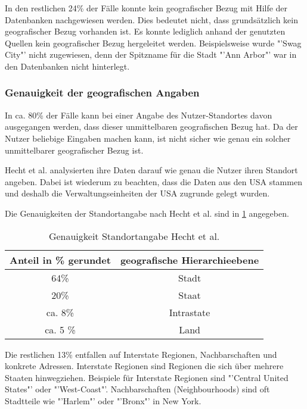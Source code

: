 				In den restlichen 24\% der Fälle konnte kein geografischer Bezug mit Hilfe der Datenbanken nachgewiesen werden. 
				Dies bedeutet nicht, dass grundsätzlich kein geografischer Bezug vorhanden ist. 
				Es konnte lediglich anhand der genutzten Quellen kein geografischer Bezug hergeleitet werden.
				Beispielsweise wurde "'Swag City"' nicht zugewiesen, denn der Spitzname für die Stadt "'Ann Arbor"' war in den Datenbanken nicht hinterlegt. 

				
			\subsubsection{Genauigkeit der geografischen Angaben}

				In ca. 80\% der Fälle kann bei einer Angabe des Nutzer-Standortes davon ausgegangen werden, dass dieser unmittelbaren geografischen Bezug hat.
				Da der Nutzer beliebige Eingaben machen kann, ist nicht sicher wie genau ein solcher unmittelbarer geografischer Bezug ist. 
				
				Hecht et al. analysierten ihre Daten darauf wie genau die Nutzer ihren Standort angeben.
				Dabei ist wiederum zu beachten, dass die Daten aus den USA stammen und deshalb die Verwaltungseinheiten der USA zugrunde gelegt wurden.
				
				Die Genauigkeiten der Standortangabe nach Hecht et al. sind in \ref{tab:genauigkeitenHecht} angegeben. 

				\begin{table}[htpb]
				\caption{Genauigkeit Standortangabe Hecht et al.} 
				\centering
				\begin{tabular}{|c||c|}
					\hline
					Anteil in \% gerundet & geografische Hierarchieebene \\
					\hline\hline
					64\% & Stadt \\
					\hline
					20\% & Staat \\
					\hline
					ca. 8\% & Intrastate \\
					\hline
					ca. 5 \% & Land \\
					\hline
				\end{tabular}
				\label{tab:genauigkeitenHecht} 
				\end{table} 

				Die restlichen 13\% entfallen auf Interstate Regionen, Nachbarschaften und konkrete Adressen. 
				Interstate Regionen sind Regionen die sich über mehrere Staaten hinwegziehen. 
				Beispiele für Interstate Regionen sind "'Central United States"' oder "'West-Coast"'.
				Nachbarschaften (Neighbourhoods) sind oft Stadtteile wie "'Harlem"' oder "'Bronx"' in New York.

